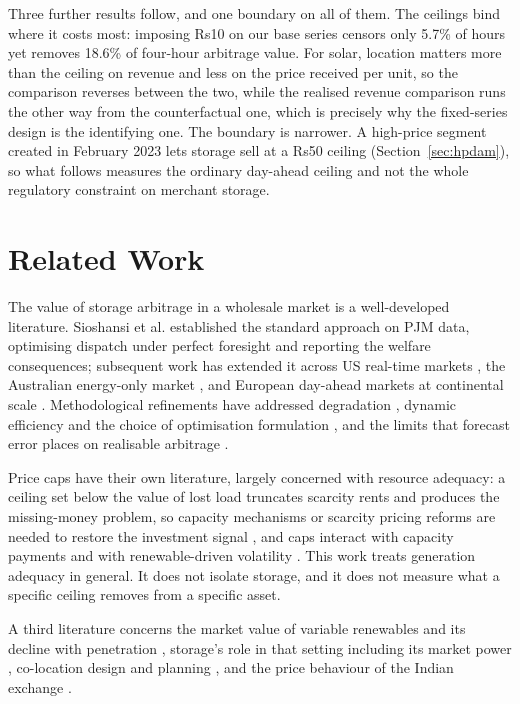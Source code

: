 \documentclass[conference,a4paper]{IEEEtran}
\begin{document}
Three further results follow, and one boundary on all of them. The ceilings bind
where it costs most: imposing Rs10 on our base series censors only 5.7\% of
hours yet removes 18.6\% of four-hour arbitrage value. For solar, location
matters more than the ceiling on revenue and less on the price received per
unit, so the comparison reverses between the two, while the realised revenue
comparison runs the other way from the counterfactual one, which is precisely
why the fixed-series design is the identifying one. The boundary is narrower. A
high-price segment created in February 2023 lets storage sell at a Rs50 ceiling
(Section~\ref{sec:hpdam}), so what follows measures the ordinary day-ahead
ceiling and not the whole regulatory constraint on merchant storage.

\section{Related Work}

The value of storage arbitrage in a wholesale market is a well-developed
literature. Sioshansi et al. \cite{sioshansi2009} established the standard
approach on PJM data, optimising dispatch under perfect foresight and reporting
the welfare consequences; subsequent work has extended it across US real-time
markets \cite{bradbury2014}, the Australian energy-only market
\cite{mcconnell2015}, and European day-ahead markets at continental scale
\cite{zafirakis2016, brijs2019, mercier2023, komorowska2024}. Methodological
refinements have addressed degradation \cite{wankmuller2017}, dynamic efficiency
and the choice of optimisation formulation \cite{grimaldi2024}, and the limits
that forecast error places on realisable arbitrage \cite{antweiler2021}.

Price caps have their own literature, largely concerned with resource adequacy:
a ceiling set below the value of lost load truncates scarcity rents and produces
the missing-money problem, so capacity mechanisms or scarcity pricing reforms are
needed to restore the investment signal \cite{wilson2000, billimoria2019,
papavasiliou2020, woo2019}, and caps interact with capacity payments and with
renewable-driven volatility \cite{milstein2019, milstein2015}. This work treats
generation adequacy in general. It does not isolate storage, and it does not
measure what a specific ceiling removes from a specific asset.

A third literature concerns the market value of variable renewables and its
decline with penetration \cite{hirth2013, brown2021}, storage's role in that
setting including its market power \cite{williams2022}, co-location design and
planning \cite{park2021}, and the price behaviour of the Indian exchange
\cite{chattopadhyay2023}.
\end{document}
